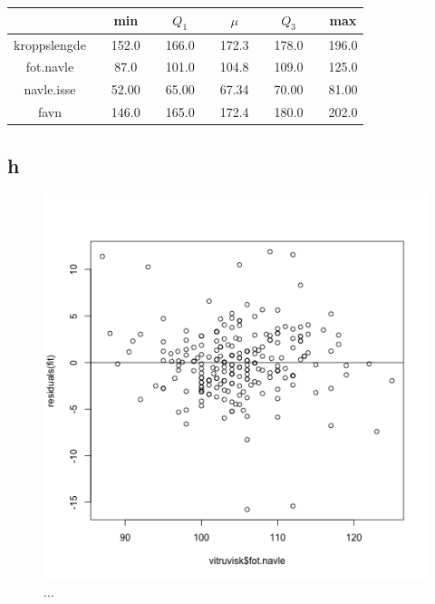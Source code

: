 \begin{center}
\label{tab:summary2}
\begin{tabularx}{\textwidth}{c X c X c X c X c X c }
    \hline
    \hline
         && min && $Q_1$ && $\mu$ && $Q_3$ && max \\
    \hline
    kroppslengde   	&& 152.0 && 166.0 && 172.3 && 178.0 && 196.0 \\
    fot.navle    	&&  87.0 && 101.0 && 104.8 && 109.0 && 125.0 \\
    navle.isse	 	&& 52.00 && 65.00 && 67.34 && 70.00 && 81.00 \\
    favn			&& 146.0 && 165.0 && 172.4 && 180.0 && 202.0 \\

    \hline
\end{tabularx}
\end{center}


\subsection*{h}

\begin{figure}[H]
		\centering
		\includegraphics[width=0.7\linewidth]{3H.pdf}
		\caption{...}
		\label{fig:3H}
\end{figure}


































